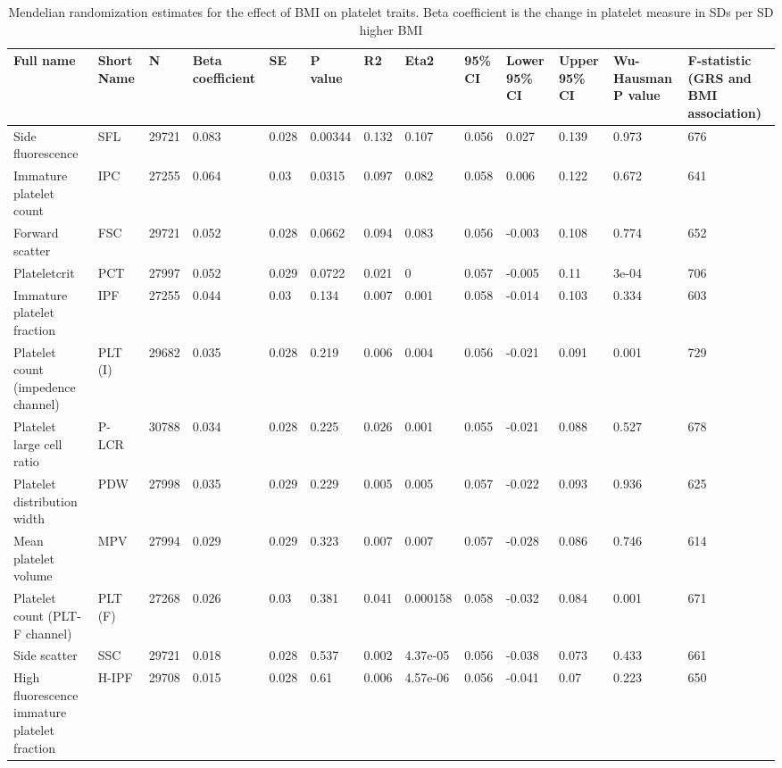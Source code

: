 \documentclass[11pt,twoside]{bristolthesis}
\begin{document}
\begin{landscape}\begin{table}

\caption[Mendelian randomization estimates for the effect of BMI on platelet traits]{\label{tab:BMI-platelets-MR}Mendelian randomization estimates for the effect of BMI on platelet traits. Βeta coefficient is the change in platelet measure in SDs per SD higher BMI}
\centering
\begin{tabu} to 
\toprule
Full name & Short Name & N & Βeta coefficient & SE & P value & R2 & Eta2 & 95\% CI & Lower 95\% CI & Upper 95\% CI & Wu-Hausman P value & F-statistic (GRS and BMI association)\\
\midrule
Side fluorescence & SFL & 29721 & 0.083 & 0.028 & 0.00344 & 0.132 & 0.107 & 0.056 & 0.027 & 0.139 & 0.973 & 676\\
Immature platelet count & IPC & 27255 & 0.064 & 0.03 & 0.0315 & 0.097 & 0.082 & 0.058 & 0.006 & 0.122 & 0.672 & 641\\
Forward scatter & FSC & 29721 & 0.052 & 0.028 & 0.0662 & 0.094 & 0.083 & 0.056 & -0.003 & 0.108 & 0.774 & 652\\
Plateletcrit & PCT & 27997 & 0.052 & 0.029 & 0.0722 & 0.021 & 0 & 0.057 & -0.005 & 0.11 & 3e-04 & 706\\
Immature platelet fraction & IPF & 27255 & 0.044 & 0.03 & 0.134 & 0.007 & 0.001 & 0.058 & -0.014 & 0.103 & 0.334 & 603\\
\addlinespace
Platelet count (impedence channel) & PLT (I) & 29682 & 0.035 & 0.028 & 0.219 & 0.006 & 0.004 & 0.056 & -0.021 & 0.091 & 0.001 & 729\\
Platelet large cell ratio & P-LCR & 30788 & 0.034 & 0.028 & 0.225 & 0.026 & 0.001 & 0.055 & -0.021 & 0.088 & 0.527 & 678\\
Platelet distribution width & PDW & 27998 & 0.035 & 0.029 & 0.229 & 0.005 & 0.005 & 0.057 & -0.022 & 0.093 & 0.936 & 625\\
Mean platelet volume & MPV & 27994 & 0.029 & 0.029 & 0.323 & 0.007 & 0.007 & 0.057 & -0.028 & 0.086 & 0.746 & 614\\
Platelet count (PLT-F channel) & PLT (F) & 27268 & 0.026 & 0.03 & 0.381 & 0.041 & 0.000158 & 0.058 & -0.032 & 0.084 & 0.001 & 671\\
\addlinespace
Side scatter & SSC & 29721 & 0.018 & 0.028 & 0.537 & 0.002 & 4.37e-05 & 0.056 & -0.038 & 0.073 & 0.433 & 661\\
High fluorescence immature platelet fraction & H-IPF & 29708 & 0.015 & 0.028 & 0.61 & 0.006 & 4.57e-06 & 0.056 & -0.041 & 0.07 & 0.223 & 650\\
\bottomrule
\end{tabu}
\end{table}
\end{landscape}
\end{document}

